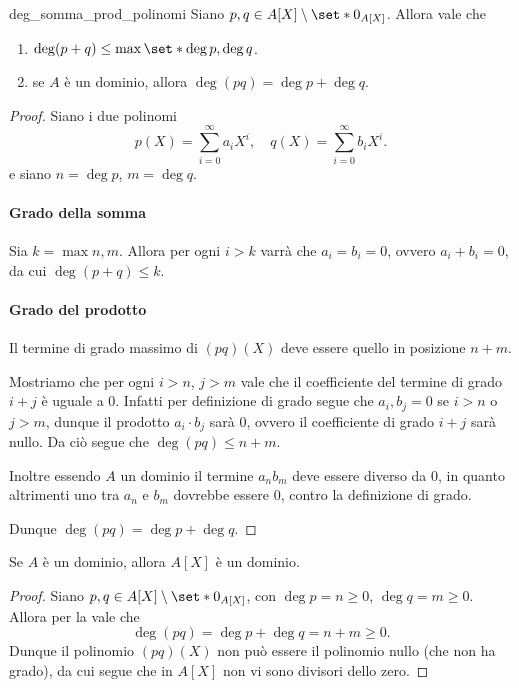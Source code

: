 \begin{proposition}
    {deg_somma_prod_polinomi}
    Siano $p, q \in A[X] \setminus \set*{0_{A[X]}}$. Allora vale che \begin{enumerate}[label={(\roman*)}]
        \item $\deg (p + q) \leq \max \set*{\deg p, \deg q}$.
        \item se $A$ è un dominio, allora $\deg (pq) = \deg p + \deg q$.
    \end{enumerate}
\end{proposition}
\begin{proof}
    Siano i due polinomi \[
        p(X) = \sum_{i = 0}^\infty a_iX^i, \quad q(X) = \sum_{i = 0}^\infty b_iX^i.   
    \] e siano $n = \deg p$, $m = \deg q$.

    \paragraph{Grado della somma} Sia $k = \max {n, m}$. Allora per ogni $i > k$ varrà che $a_i = b_i = 0$, ovvero $a_i + b_i = 0$, da cui $\deg (p + q) \leq k$.

    \paragraph{Grado del prodotto} Il termine di grado massimo di $(pq)(X)$ deve essere quello in posizione $n + m$. 
    
    Mostriamo che per ogni $i > n$, $j > m$ vale che il coefficiente del termine di grado $i + j$ è uguale a $0$.
    Infatti per definizione di grado segue che $a_i, b_j = 0$ se $i > n$ o $j > m$, dunque il prodotto $a_i \cdot b_j$ sarà $0$, ovvero il coefficiente di grado $i + j$ sarà nullo. Da ciò segue che $\deg (pq) \leq n + m$.

    Inoltre essendo $A$ un dominio il termine $a_nb_m$ deve essere diverso da $0$, in quanto altrimenti uno tra $a_n$ e $b_m$ dovrebbe essere $0$, contro la definizione di grado.

    Dunque $\deg (pq) = \deg p + \deg q$.
\end{proof}

\begin{corollary}
    Se $A$ è un dominio, allora $A[X]$ è un dominio.
\end{corollary}
\begin{proof}
    Siano $p, q \in A[X] \setminus \set*{0_{A[X]}}$, con $\deg p = n \geq 0$, $\deg q = m \geq 0$. Allora per la  vale che \[
        \deg (pq) = \deg p + \deg q = n + m \geq 0.    
    \] Dunque il polinomio $(pq)(X)$ non può essere il polinomio nullo (che non ha grado), da cui segue che in $A[X]$ non vi sono divisori dello zero.
\end{proof}

